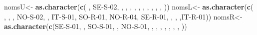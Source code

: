 \documentclass[
  openany]{book}
\newenvironment{Shaded}{\begin{snugshade}}{\end{snugshade}}
\newcommand{\FunctionTok}[1]{\textcolor[rgb]{0.13,0.29,0.53}{\textbf{#1}}}
\newcommand{\NormalTok}[1]{#1}
\newcommand{\OtherTok}[1]{\textcolor[rgb]{0.56,0.35,0.01}{#1}}
\newcommand{\StringTok}[1]{\textcolor[rgb]{0.31,0.60,0.02}{#1}}
\theoremstyle{definition}
\theoremstyle{definition}
\theoremstyle{definition}
\theoremstyle{definition}
\theoremstyle{remark}
\begin{document}
\begin{Shaded}
\begin{Highlighting}[]
\NormalTok{nomsU}\OtherTok{\textless{}{-}} \FunctionTok{as.character}\NormalTok{(}\FunctionTok{c}\NormalTok{(}\StringTok{\textquotesingle{} \textquotesingle{}}\NormalTok{,   }\StringTok{\textquotesingle{}SE{-}S{-}02\textquotesingle{}}\NormalTok{,  }\StringTok{\textquotesingle{} \textquotesingle{}}\NormalTok{, }\StringTok{\textquotesingle{}\textquotesingle{}}\NormalTok{,   }\StringTok{\textquotesingle{} \textquotesingle{}}\NormalTok{,  }\StringTok{\textquotesingle{} \textquotesingle{}}\NormalTok{, }\StringTok{\textquotesingle{} \textquotesingle{}}\NormalTok{,   }\StringTok{\textquotesingle{} \textquotesingle{}}\NormalTok{,  }\StringTok{\textquotesingle{} \textquotesingle{}}\NormalTok{,}\StringTok{\textquotesingle{} \textquotesingle{}}\NormalTok{,}\StringTok{\textquotesingle{} \textquotesingle{}}\NormalTok{,}\StringTok{\textquotesingle{} \textquotesingle{}}\NormalTok{,}\StringTok{\textquotesingle{} \textquotesingle{}}\NormalTok{))}
\NormalTok{nomsL}\OtherTok{\textless{}{-}} \FunctionTok{as.character}\NormalTok{(}\FunctionTok{c}\NormalTok{(}\StringTok{\textquotesingle{} \textquotesingle{}}\NormalTok{,   }\StringTok{\textquotesingle{} \textquotesingle{}}\NormalTok{,  }\StringTok{\textquotesingle{} \textquotesingle{}}\NormalTok{, }\StringTok{\textquotesingle{}NO{-}S{-}02\textquotesingle{}}\NormalTok{,   }\StringTok{\textquotesingle{} \textquotesingle{}}\NormalTok{,  }\StringTok{\textquotesingle{}IT{-}S{-}01\textquotesingle{}}\NormalTok{, }\StringTok{\textquotesingle{}SO{-}R{-}01\textquotesingle{}}\NormalTok{,   }\StringTok{\textquotesingle{}NO{-}R{-}04\textquotesingle{}}\NormalTok{,  }\StringTok{\textquotesingle{}SE{-}R{-}01\textquotesingle{}}\NormalTok{,}\StringTok{\textquotesingle{} \textquotesingle{}}\NormalTok{,}\StringTok{\textquotesingle{} \textquotesingle{}}\NormalTok{,}\StringTok{\textquotesingle{} \textquotesingle{}}\NormalTok{,}\StringTok{\textquotesingle{}IT{-}R{-}01\textquotesingle{}}\NormalTok{))}
\NormalTok{nomsR}\OtherTok{\textless{}{-}} \FunctionTok{as.character}\NormalTok{(}\FunctionTok{c}\NormalTok{(}\StringTok{\textquotesingle{}SE{-}S{-}01\textquotesingle{}}\NormalTok{,   }\StringTok{\textquotesingle{} \textquotesingle{}}\NormalTok{,  }\StringTok{\textquotesingle{}SO{-}S{-}01\textquotesingle{}}\NormalTok{, }\StringTok{\textquotesingle{} \textquotesingle{}}\NormalTok{,   }\StringTok{\textquotesingle{}NO{-}S{-}01\textquotesingle{}}\NormalTok{,  }\StringTok{\textquotesingle{} \textquotesingle{}}\NormalTok{, }\StringTok{\textquotesingle{} \textquotesingle{}}\NormalTok{,   }\StringTok{\textquotesingle{} \textquotesingle{}}\NormalTok{,  }\StringTok{\textquotesingle{} \textquotesingle{}}\NormalTok{,}\StringTok{\textquotesingle{} \textquotesingle{}}\NormalTok{,}\StringTok{\textquotesingle{} \textquotesingle{}}\NormalTok{,}\StringTok{\textquotesingle{} \textquotesingle{}}\NormalTok{,}\StringTok{\textquotesingle{} \textquotesingle{}}\NormalTok{))}

\end{Highlighting}
\end{Shaded}
\end{document}
